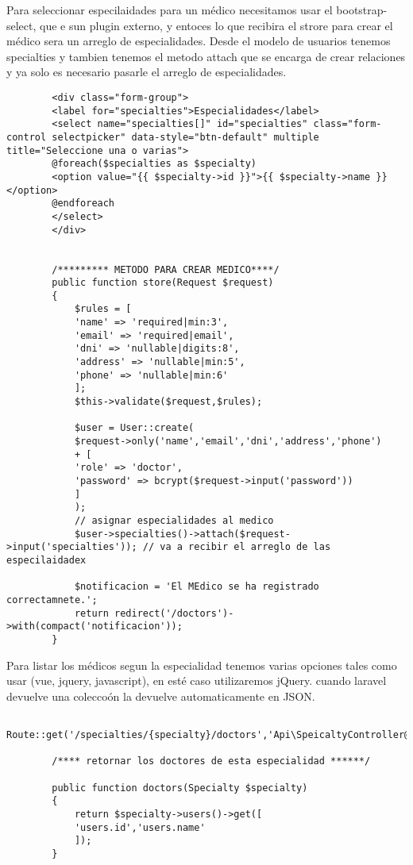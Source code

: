 \documentclass[a4paper]{article}
\begin{document}
	Para seleccionar especilaidades para un médico necesitamos usar el bootstrap-select, que e sun plugin externo, y entoces lo que recibira el strore para crear el médico sera un arreglo de especialidades. Desde el modelo de usuarios tenemos specialties y tambien tenemos el metodo attach que se encarga de crear relaciones y ya solo es necesario pasarle el arreglo de especialidades.
	
	\begin{lstlisting}
		<div class="form-group">
		<label for="specialties">Especialidades</label>
		<select name="specialties[]" id="specialties" class="form-control selectpicker" data-style="btn-default" multiple title="Seleccione una o varias">
		@foreach($specialties as $specialty)
		<option value="{{ $specialty->id }}">{{ $specialty->name }}</option>
		@endforeach
		</select>
		</div>
		
		
		/********* METODO PARA CREAR MEDICO****/
		public function store(Request $request)
		{
			$rules = [
			'name' => 'required|min:3',
			'email' => 'required|email',
			'dni' => 'nullable|digits:8',
			'address' => 'nullable|min:5',
			'phone' => 'nullable|min:6'
			];
			$this->validate($request,$rules);
			
			$user = User::create(
			$request->only('name','email','dni','address','phone')
			+ [
			'role' => 'doctor',
			'password' => bcrypt($request->input('password'))
			]
			);
			// asignar especialidades al medico
			$user->specialties()->attach($request->input('specialties')); // va a recibir el arreglo de las especilaidadex
			
			$notificacion = 'El MEdico se ha registrado correctamnete.';
			return redirect('/doctors')->with(compact('notificacion'));
		}
	\end{lstlisting}

	Para listar los médicos segun la especialidad tenemos varias opciones tales como usar (vue, jquery, javascript), en esté caso utilizaremos jQuery. cuando laravel devuelve una coleccoón la devuelve automaticamente en JSON.
	
	\begin{lstlisting}
		Route::get('/specialties/{specialty}/doctors','Api\SpeicaltyController@doctors');
		
		/**** retornar los doctores de esta especialidad ******/
		
		public function doctors(Specialty $specialty)
		{
			return $specialty->users()->get([
			'users.id','users.name'
			]);
		}
	\end{lstlisting}
\end{document}

